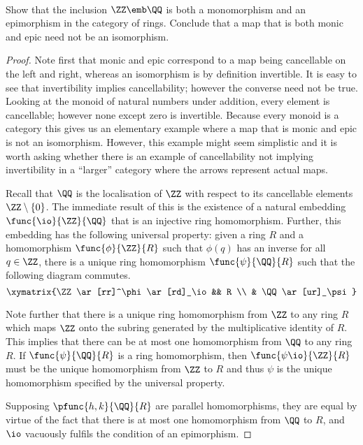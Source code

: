 \documentclass[../../main]{subfiles}
\begin{document}
\paragraph{}
\begin{exercise}
	Show that the inclusion \(\ZZ\emb\QQ\) is both a monomorphism and an
	epimorphism in the category \Ring of rings. Conclude that a map that is both
	monic and epic need not be an isomorphism.
\end{exercise}
\begin{proof}
	Note first that monic and epic correspond to a map being cancellable on the
	left and right, whereas an isomorphism is by definition invertible. It is
	easy to see that invertibility implies cancellability; however the converse
	need not be true. Looking at the monoid of natural numbers under addition,
	every element is cancellable; however none except zero is invertible.
	Because every monoid is a category this gives us an elementary example where
	a map that is monic and epic is not an isomorphism. However, this example
	might seem simplistic and it is worth asking whether there is an example of
	cancellability not implying invertibility in a ``larger'' category where the
	arrows represent actual maps.

	Recall that \(\QQ\) is the localisation of \(\ZZ\) with respect to its
	cancellable elements \(\ZZ\setminus\{0\}\). The immediate result of this is
	the existence of a natural embedding \(\func{\io}{\ZZ}{\QQ}\) that is an
	injective ring homomorphism. Further, this embedding has the following
	universal property: given a ring \(R\) and a homomorphism
	\(\func{\phi}{\ZZ}{R}\) such that \(\phi(q)\) has an inverse for all
	\(q\in\ZZ\), there is a unique ring homomorphism \(\func{\psi}{\QQ}{R}\)
	such that the following diagram commutes.
	\[\xymatrix{\ZZ \ar[rr]^\phi \ar[rd]_\io && R \\ & \QQ \ar[ur]_\psi}\]

	Note further that there is a unique ring homomorphism from \(\ZZ\) to any
	ring \(R\) which maps \(\ZZ\) onto the subring generated by the
	multiplicative identity of \(R\). This implies that there can be at most one
	homomorphism from \(\QQ\) to any ring \(R\). If \(\func{\psi}{\QQ}{R}\) is a
	ring homomorphism, then \(\func{\psi\io}{\ZZ}{R}\) must be the unique
	homomorphism from \(\ZZ\) to \(R\) and thus \(\psi\) is the unique
	homomorphism specified by the universal property.

	Supposing \(\pfunc{h,k}{\QQ}{R}\) are parallel homomorphisms, they are equal
	by virtue of the fact that there is at most one homomorphism from \(\QQ\) to
	\(R\), and \(\io\) vacuously fulfils the condition of an epimorphism.
\end{proof}
\end{document}
